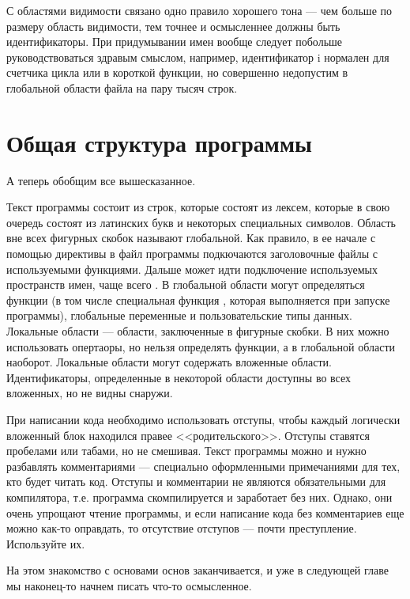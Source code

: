 \documentclass[book.tex]{subfiles}
\begin{document}

С областями видимости связано одно правило хорошего тона --- чем больше по размеру область видимости, тем точнее и осмысленнее должны быть идентификаторы. При придумывании имен вообще следует побольше руководствоваться здравым смыслом, например, идентификатор i нормален для счетчика цикла или в короткой функции, но совершенно недопустим в глобальной области файла на пару тысяч строк.

\section*{Общая структура программы}

А теперь обобщим все вышесказанное.

Текст программы состоит из строк, которые состоят из лексем, которые в свою очередь состоят из латинских букв и некоторых специальных символов. Область вне всех фигурных скобок называют глобальной. Как правило, в ее начале с помощью директивы  в файл программы подкючаются заголовочные файлы с используемыми функциями. Дальше может идти подключение используемых пространств имен, чаще всего . В глобальной области могут определяться функции (в том числе специальная функция , которая выполняется при запуске программы), глобальные переменные и пользовательские типы данных. Локальные области --- области, заключенные в фигурные скобки. В них можно использовать опертаоры, но нельзя определять функции, а в глобальной области наоборот. Локальные области могут содержать вложенные области. Идентификаторы, определенные в некоторой области доступны во всех вложенных, но не видны снаружи.

При написании кода необходимо использовать отступы, чтобы каждый логически вложенный блок находился правее <<родительского>>. Отступы ставятся пробелами или табами, но не смешивая. Текст программы можно и нужно разбавлять комментариями --- специально оформленными примечаниями для тех, кто будет читать код. Отступы и комментарии не являются обязательными для компилятора, т.е. программа скомпилируется и заработает без них. Однако, они очень упрощают чтение программы, и если написание кода без комментариев еще можно как-то оправдать, то отсутствие отступов --- почти преступление. Используйте их.

На этом знакомство с основами основ заканчивается, и уже в следующей главе мы наконец-то начнем писать что-то осмысленное.
\end{document}
